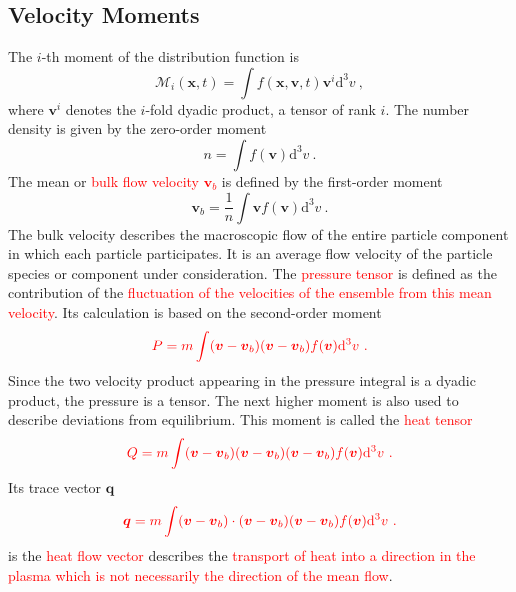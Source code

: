 \documentclass[12pt,a4paper]{article}
\renewcommand{\vec}[1]{\boldsymbol{#1}}
\newcommand{\dif}{\mathrm{d}}
\begin{document}
\subsection{Velocity Moments}
The $i$-th moment of the distribution function is
\begin{equation}
\mathcal M_i (\vec{x}, t) = \int f(\vec{x}, \vec{v}, t) \vec{v}^i \dif^3 v ~,
\end{equation}
where $\vec{v}^i$ denotes the $i$-fold dyadic product, a tensor of rank $i$. The number density is given by the zero-order moment
\begin{equation}
n = \int f(\vec{v}) \dif^3 v ~.
\end{equation}
The mean or \textcolor{red}{bulk flow velocity $\vec{v}_b$} is defined by the first-order moment
\begin{equation}
\vec{v}_b = \frac{1}{n} \int \vec{v} f(\vec{v}) \dif^3 v ~.
\end{equation}
The bulk velocity describes the macroscopic flow of the entire particle component in which each particle participates. It is an average flow velocity of the particle species or component under consideration. The \textcolor{red}{pressure tensor} is defined as the contribution of the \textcolor{red}{fluctuation of the velocities of the ensemble from this mean velocity}. Its calculation is based on the second-order
moment
\begin{equation}
\color{red} P = m \int (\vec{v} -\vec{v}_b)(\vec{v}-\vec{v}_b) f(\vec{v}) \dif^3 v ~.
\end{equation}
Since the two velocity product appearing in the pressure integral is a dyadic product, the pressure is a tensor. The next higher moment is also used to describe deviations from equilibrium. This moment is called the \textcolor{red}{heat tensor}
\begin{equation}
\color{red} Q = m \int (\vec{v} -\vec{v}_b)(\vec{v}-\vec{v}_b)(\vec{v} -\vec{v}_b) f(\vec{v}) \dif^3 v ~.
\end{equation}
Its trace vector $\vec{q}$
\begin{equation}
\color{red} \vec{q} = m \int (\vec{v} -\vec{v}_b)\cdot (\vec{v}-\vec{v}_b)(\vec{v} -\vec{v}_b) f(\vec{v}) \dif^3 v ~.
\end{equation}
is the \textcolor{red}{heat flow vector} describes the \textcolor{red}{transport of heat into a direction in the plasma which is not necessarily the direction of the mean flow}.
\end{document}
